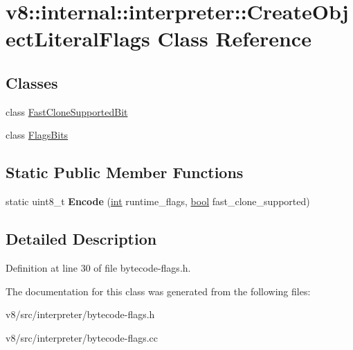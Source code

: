 \hypertarget{classv8_1_1internal_1_1interpreter_1_1CreateObjectLiteralFlags}{}\section{v8\+:\+:internal\+:\+:interpreter\+:\+:Create\+Object\+Literal\+Flags Class Reference}
\label{classv8_1_1internal_1_1interpreter_1_1CreateObjectLiteralFlags}
\subsection*{Classes}
\begin{DoxyCompactItemize}
\item 
class \mbox{\hyperlink{classv8_1_1internal_1_1interpreter_1_1CreateObjectLiteralFlags_1_1FastCloneSupportedBit}{Fast\+Clone\+Supported\+Bit}}
\item 
class \mbox{\hyperlink{classv8_1_1internal_1_1interpreter_1_1CreateObjectLiteralFlags_1_1FlagsBits}{Flags\+Bits}}
\end{DoxyCompactItemize}
\subsection*{Static Public Member Functions}
\begin{DoxyCompactItemize}
\item 
\mbox{\label{classv8_1_1internal_1_1interpreter_1_1CreateObjectLiteralFlags_a4b9a2cd6fb7546488c992c305fafdc70}} 
static uint8\+\_\+t {\bfseries Encode} (\mbox{\hyperlink{classint}{int}} runtime\+\_\+flags, \mbox{\hyperlink{classbool}{bool}} fast\+\_\+clone\+\_\+supported)
\end{DoxyCompactItemize}


\subsection{Detailed Description}


Definition at line 30 of file bytecode-\/flags.\+h.



The documentation for this class was generated from the following files\+:\begin{DoxyCompactItemize}
\item 
v8/src/interpreter/bytecode-\/flags.\+h\item 
v8/src/interpreter/bytecode-\/flags.\+cc\end{DoxyCompactItemize}
